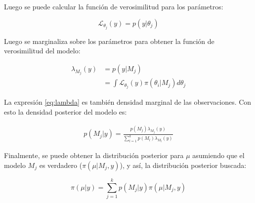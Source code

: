 Luego se puede calcular la función de verosimilitud para los parámetros:

\begin{equation}
\mathcal{L}_{\theta_j}(y) = p(y|\theta_j)
\end{equation}

Luego se marginaliza sobre los parámetros para obtener la función de verosimilitud del modelo:

\begin{align}
\lambda_{M_j}(y) & = p(y|M_j)\\
& = \int \mathcal{L}_{\theta_j}(y) \pi(\theta_i|M_j) d\theta_j\label{eq:lambda}
\end{align}

La expresión \eqref{eq:lambda} es también densidad marginal de las observaciones. Con esto la densidad posterior del modelo es:

\begin{align}
p(M_j|y) = \frac{p(M_j)\lambda_{M_j}(y)}{\sum_{l=1}^k p(M_{l})\lambda_{M_{l}}(y)}    
\end{align}

Finalmente, se puede obtener la distribución posterior para $\mu$ asumiendo que el modelo $M_j$ es verdadero ($\pi(\mu|M_j,y)$), y así, la distribución posterior buscada:

\begin{equation}
\pi(\mu|y) = \sum_{j = 1}^k p(M_j|y)\pi(\mu|M_j,y)
\end{equation}

